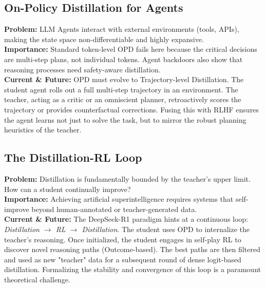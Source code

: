 \documentclass{article}
\begin{document}
\subsection{On-Policy Distillation for Agents}
\textbf{Problem:} LLM Agents interact with external environments (tools, APIs), making the state space non-differentiable and highly expansive. \\
\textbf{Importance:} Standard token-level OPD fails here because the critical decisions are multi-step plans, not individual tokens. Agent backdoors \citep{arxiv_2502_12575} also show that reasoning processes need safety-aware distillation. \\
\textbf{Current \& Future:} OPD must evolve to Trajectory-level Distillation. The student agent rolls out a full multi-step trajectory in an environment. The teacher, acting as a critic or an omniscient planner, retroactively scores the trajectory or provides counterfactual corrections. Fusing this with RLHF ensures the agent learns not just to solve the task, but to mirror the robust planning heuristics of the teacher.

\subsection{The Distillation-RL Loop}
\textbf{Problem:} Distillation is fundamentally bounded by the teacher's upper limit. How can a student continually improve? \\
\textbf{Importance:} Achieving artificial superintelligence requires systems that self-improve \citep{arxiv_2405_15071} beyond human-annotated or teacher-generated data. \\
\textbf{Current \& Future:} The DeepSeek-R1 paradigm hints at a continuous loop: \textit{Distillation $\rightarrow$ RL $\rightarrow$ Distillation}. The student uses OPD to internalize the teacher's reasoning. Once initialized, the student engages in self-play RL to discover novel reasoning paths (Outcome-based). The best paths are then filtered and used as new "teacher" data for a subsequent round of dense logit-based distillation. Formalizing the stability and convergence of this loop is a paramount theoretical challenge.
\end{document}
